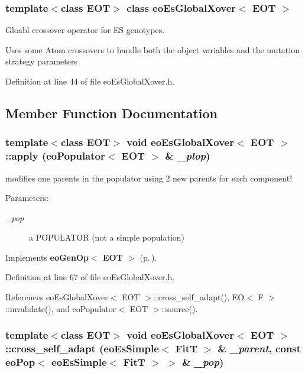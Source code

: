 \subsubsection*{template$<$class EOT$>$ class eo\-Es\-Global\-Xover$<$ EOT $>$}

Gloabl crossover operator for ES genotypes. 

Uses some Atom crossovers to handle both the object variables and the mutation strategy parameters 



Definition at line 44 of file eo\-Es\-Global\-Xover.h.

\subsection{Member Function Documentation}
\subsubsection{\setlength{\rightskip}{0pt plus 5cm}template$<$class EOT$>$ void {\bf eo\-Es\-Global\-Xover}$<$ {\bf EOT} $>$::apply ({\bf eo\-Populator}$<$ {\bf EOT} $>$ \& {\em \_\-plop})\hspace{0.3cm}{\tt  [inline, virtual]}}\label{classeo_es_global_xover_a3}


modifies one parents in the populator using 2 new parents for each component! 

\begin{Desc}
\item[Parameters:]
\begin{description}
\item[{\em \_\-pop}]a POPULATOR (not a simple population) \end{description}
\end{Desc}


Implements {\bf eo\-Gen\-Op$<$ EOT $>$} {\rm (p.\,\pageref{classeo_gen_op_b0})}.

Definition at line 67 of file eo\-Es\-Global\-Xover.h.

References eo\-Es\-Global\-Xover$<$ EOT $>$::cross\_\-self\_\-adapt(), EO$<$ F $>$::invalidate(), and eo\-Populator$<$ EOT $>$::source().
\subsubsection{\setlength{\rightskip}{0pt plus 5cm}template$<$class EOT$>$ void {\bf eo\-Es\-Global\-Xover}$<$ {\bf EOT} $>$::cross\_\-self\_\-adapt ({\bf eo\-Es\-Simple}$<$ Fit\-T $>$ \& {\em \_\-parent}, const {\bf eo\-Pop}$<$ {\bf eo\-Es\-Simple}$<$ Fit\-T $>$ $>$ \& {\em \_\-pop})\hspace{0.3cm}{\tt  [inline, private]}}\label{classeo_es_global_xover_d0}


